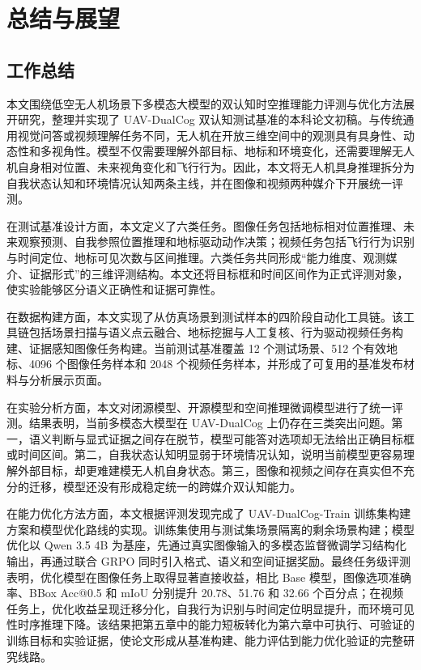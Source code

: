 
\chapter{总结与展望}

\section{工作总结}

本文围绕低空无人机场景下多模态大模型的双认知时空推理能力评测与优化方法展开研究，整理并实现了 UAV-DualCog 双认知测试基准的本科论文初稿。与传统通用视觉问答或视频理解任务不同，无人机在开放三维空间中的观测具有具身性、动态性和多视角性。模型不仅需要理解外部目标、地标和环境变化，还需要理解无人机自身相对位置、未来视角变化和飞行行为。因此，本文将无人机具身推理拆分为自我状态认知和环境情况认知两条主线，并在图像和视频两种媒介下开展统一评测。

在测试基准设计方面，本文定义了六类任务。图像任务包括地标相对位置推理、未来观察预测、自我参照位置推理和地标驱动动作决策；视频任务包括飞行行为识别与时间定位、地标可见次数与区间推理。六类任务共同形成“能力维度、观测媒介、证据形式”的三维评测结构。本文还将目标框和时间区间作为正式评测对象，使实验能够区分语义正确性和证据可靠性。

在数据构建方面，本文实现了从仿真场景到测试样本的四阶段自动化工具链。该工具链包括场景扫描与语义点云融合、地标挖掘与人工复核、行为驱动视频任务构建、证据感知图像任务构建。当前测试基准覆盖 12 个测试场景、512 个有效地标、4096 个图像任务样本和 2048 个视频任务样本，并形成了可复用的基准发布材料与分析展示页面。

在实验分析方面，本文对闭源模型、开源模型和空间推理微调模型进行了统一评测。结果表明，当前多模态大模型在 UAV-DualCog 上仍存在三类突出问题。第一，语义判断与显式证据之间存在脱节，模型可能答对选项却无法给出正确目标框或时间区间。第二，自我状态认知明显弱于环境情况认知，说明当前模型更容易理解外部目标，却更难建模无人机自身状态。第三，图像和视频之间存在真实但不充分的迁移，模型还没有形成稳定统一的跨媒介双认知能力。

在能力优化方法方面，本文根据评测发现完成了 UAV-DualCog-Train 训练集构建方案和模型优化路线的实现。训练集使用与测试集场景隔离的剩余场景构建；模型优化以 Qwen 3.5 4B 为基座，先通过真实图像输入的多模态监督微调学习结构化输出，再通过联合 GRPO 同时引入格式、语义和空间证据奖励。最终任务级评测表明，优化模型在图像任务上取得显著直接收益，相比 Base 模型，图像选项准确率、BBox Acc@0.5 和 mIoU 分别提升 20.78、51.76 和 32.66 个百分点；在视频任务上，优化收益呈现迁移分化，自我行为识别与时间定位明显提升，而环境可见性时序推理下降。该结果把第五章中的能力短板转化为第六章中可执行、可验证的训练目标和实验证据，使论文形成从基准构建、能力评估到能力优化验证的完整研究线路。

